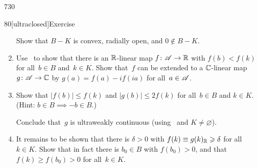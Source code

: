 \begin{parsec}{730}
\begin{point}{80}[ultraclosed]{Exercise}
\begin{enumerate}
	Show that $B-K$ is convex, radially open, and $0\notin B-K$.
\item
	Use~ to show that
	 there is an $\mathbb{R}$-linear map $f\colon \mathscr{A}\to \mathbb{R}$
	with $f(b)<f(k)$ for all~$b\in B$ and~$k\in K$.
	Show that~$f$
	can be extended to a $\mathbb{C}$-linear map
	$g \colon \mathscr{A}\to \mathbb{C}$
	by $g(a)= f(a)-if(ia)$ for all~$a\in\mathscr{A}$.
\item
	Show that $\left| f(b)\right| \leq f(k)$ 
	and $\left|g(b)\right|\leq 2f(k)$
	for all~$b\in B$ and $k\in K$.\\
	(Hint: $b\in B\implies -b\in B$.)

	Conclude that~$g$ is ultraweakly continuous
	(using~ and $K\neq \varnothing$).
\item
	It remains to be shown that
	there is $\delta>0$ with $f(k)\equiv g(k)_{\mathbb{R}}\geqslant \delta$
	for all~$k\in K$.
	Show that in fact there is $b_0\in B$
	with $f(b_0) >0$,
	and  that $f(k)\geq f(b_0)>0 $ for all~$k\in K$.
\end{enumerate}
\end{point}
\end{parsec}

